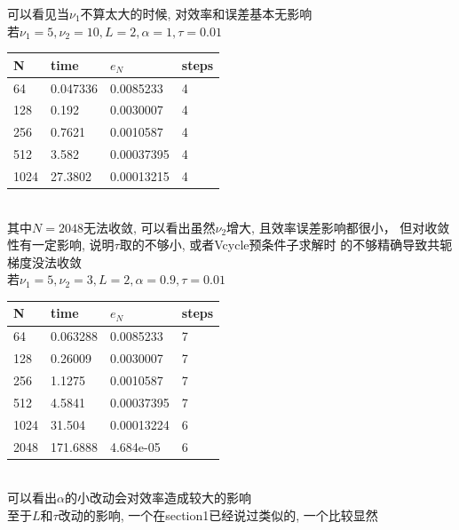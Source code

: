 \documentclass{article}
\begin{document}
可以看见当$\nu_1$不算太大的时候, 对效率和误差基本无影响\\
若$\nu_1=5,\nu_2=10,L=2,\alpha=1,\tau=0.01$\\
\begin{tabular}{llll}
N & time & $e_N$ & steps \\ 
\hline 
64 & 0.047336 & 0.0085233 & 4 \\ 
128 & 0.192 & 0.0030007 & 4 \\ 
256 & 0.7621 & 0.0010587 & 4 \\ 
512 & 3.582 & 0.00037395 & 4 \\ 
1024 & 27.3802 & 0.00013215 & 4 \\ 
\hline 
\end{tabular}\\
其中$N=2048$无法收敛, 可以看出虽然$\nu_2$增大, 且效率误差影响都很小，
但对收敛性有一定影响, 说明$\tau$取的不够小, 或者Vcycle预条件子求解时
的不够精确导致共轭梯度没法收敛\\
若$\nu_1=5,\nu_2=3,L=2,\alpha=0.9,\tau=0.01$\\
\begin{tabular}{llll}
N & time & $e_N$ & steps \\ 
\hline 
64 & 0.063288 & 0.0085233 & 7 \\ 
128 & 0.26009 & 0.0030007 & 7 \\ 
256 & 1.1275 & 0.0010587 & 7 \\ 
512 & 4.5841 & 0.00037395 & 7 \\ 
1024 & 31.504 & 0.00013224 & 6 \\ 
2048 & 171.6888 & 4.684e-05 & 6 \\ 
\hline
\end{tabular}\\
可以看出$\alpha$的小改动会对效率造成较大的影响\\
至于$L$和$\tau$改动的影响, 一个在section1已经说过类似的, 一个比较显然
\end{document}
